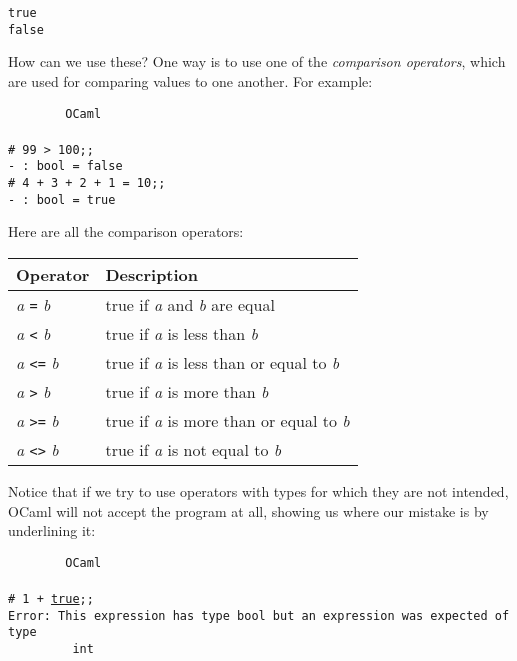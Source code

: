 \documentclass[]{book}
\newcommand{\smspace}{\vspace{4mm}}
\begin{document}
\smspace
{}\texttt{true}\\
\indent{}\texttt{false}
\smspace

\noindent How can we use these? One way is to use one of the \textit{comparison operators}, which are used for comparing values to one another. For example:

\smspace
\noindent\verb!        OCaml!\\
\noindent\\
\noindent\verb!# 99 > 100;;!\\
\noindent\verb!- : bool = false!\\
\noindent\verb!# 4 + 3 + 2 + 1 = 10;;!\\
\noindent\verb!- : bool = true!
\smspace

\noindent Here are all the comparison operators:

\smspace
\noindent\begin{tabular}{@{}ll@{}} \toprule
Operator & Description\\
\midrule
\index{=@\texttt{=}}\textit{a} \texttt{=} \textit{b} & true if \textit{a} and \textit{b} are equal\\
\index{<@\texttt{<}}\textit{a} \texttt{<} \textit{b} & true if \textit{a} is less than \textit{b}\\
\index{<=@\texttt{<=}}\textit{a} \texttt{<=} \textit{b} & true if \textit{a} is less than or equal to \textit{b}\\
\index{>@\texttt{>}}\textit{a} \texttt{>} \textit{b} & true if \textit{a} is more than \textit{b}\\
\index{>=@\texttt{>=}}\textit{a} \texttt{>=} \textit{b} & true if \textit{a} is more than or equal to \textit{b}\\
\index{<>@\texttt{<>}}\textit{a} \texttt{<>} \textit{b} & true if \textit{a} is not equal to \textit{b}\\ \bottomrule
\end{tabular}
\smspace

\noindent Notice that if we try to use operators with types for which they are not intended, OCaml will not accept the program at all, showing us where our mistake is by underlining it:

\smspace
\noindent\verb!        OCaml!\\
\noindent\\
\noindent\texttt{\# 1 + \underline{\vphantom{g}true};;}\\
\noindent\texttt{Error:\ This expression has type bool but an expression was expected of type}\\
\noindent\verb!         int!
\smspace
\end{document}
